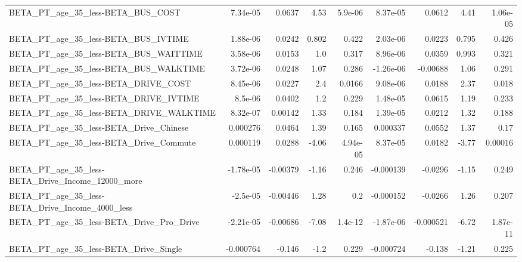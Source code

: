 \begin{tabular}{lrrrrrrrr}
BETA\_PT\_age\_35\_less-BETA\_BUS\_COST                  &    7.34e-05 &       0.0637 &      4.53 &  5.9e-06 &   8.37e-05 &      0.0612 &         4.41 &      1.06e-05 \\
BETA\_PT\_age\_35\_less-BETA\_BUS\_IVTIME                &    1.88e-06 &       0.0242 &     0.802 &    0.422 &   2.03e-06 &      0.0223 &        0.795 &         0.426 \\
BETA\_PT\_age\_35\_less-BETA\_BUS\_WAITTIME              &    3.58e-06 &       0.0153 &       1.0 &    0.317 &   8.96e-06 &      0.0359 &        0.993 &         0.321 \\
BETA\_PT\_age\_35\_less-BETA\_BUS\_WALKTIME              &    3.72e-06 &       0.0248 &      1.07 &    0.286 &  -1.26e-06 &    -0.00688 &         1.06 &         0.291 \\
BETA\_PT\_age\_35\_less-BETA\_DRIVE\_COST                &    8.45e-06 &       0.0227 &       2.4 &   0.0166 &   9.08e-06 &      0.0188 &         2.37 &         0.018 \\
BETA\_PT\_age\_35\_less-BETA\_DRIVE\_IVTIME              &     8.5e-06 &       0.0402 &       1.2 &    0.229 &   1.48e-05 &      0.0615 &         1.19 &         0.233 \\
BETA\_PT\_age\_35\_less-BETA\_DRIVE\_WALKTIME            &    8.32e-07 &      0.00142 &      1.33 &    0.184 &   1.39e-05 &      0.0212 &         1.32 &         0.188 \\
BETA\_PT\_age\_35\_less-BETA\_Drive\_Chinese             &    0.000276 &       0.0464 &      1.39 &    0.165 &   0.000337 &      0.0552 &         1.37 &          0.17 \\
BETA\_PT\_age\_35\_less-BETA\_Drive\_Commute             &    0.000119 &       0.0288 &     -4.06 & 4.94e-05 &   8.37e-05 &      0.0182 &        -3.77 &       0.00016 \\
BETA\_PT\_age\_35\_less-BETA\_Drive\_Income\_12000\_more   &   -1.78e-05 &     -0.00379 &     -1.16 &    0.246 &  -0.000139 &     -0.0296 &        -1.15 &         0.249 \\
BETA\_PT\_age\_35\_less-BETA\_Drive\_Income\_4000\_less    &    -2.5e-05 &     -0.00446 &      1.28 &      0.2 &  -0.000152 &     -0.0266 &         1.26 &         0.207 \\
BETA\_PT\_age\_35\_less-BETA\_Drive\_Pro\_Drive           &   -2.21e-05 &     -0.00686 &     -7.08 &  1.4e-12 &  -1.87e-06 &   -0.000521 &        -6.72 &      1.87e-11 \\
BETA\_PT\_age\_35\_less-BETA\_Drive\_Single              &   -0.000764 &       -0.146 &      -1.2 &    0.229 &  -0.000724 &      -0.138 &        -1.21 &         0.225 \\

\end{tabular}
